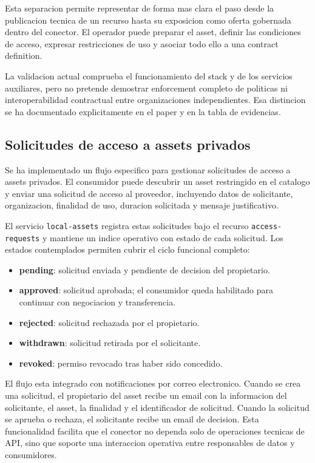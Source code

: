\documentclass{article}
\begin{document}
Esta separacion permite representar de forma mas clara el paso desde la publicacion tecnica de un recurso hasta su exposicion como oferta gobernada dentro del conector. El operador puede preparar el asset, definir las condiciones de acceso, expresar restricciones de uso y asociar todo ello a una contract definition.

La validacion actual comprueba el funcionamiento del stack y de los servicios auxiliares, pero no pretende demostrar enforcement completo de politicas ni interoperabilidad contractual entre organizaciones independientes. Esa distincion se ha documentado explicitamente en el paper y en la tabla de evidencias.

\subsection{Solicitudes de acceso a assets privados}

Se ha implementado un flujo especifico para gestionar solicitudes de acceso a assets privados. El consumidor puede descubrir un asset restringido en el catalogo y enviar una solicitud de acceso al proveedor, incluyendo datos de solicitante, organizacion, finalidad de uso, duracion solicitada y mensaje justificativo.

El servicio \texttt{local-assets} registra estas solicitudes bajo el recurso \texttt{access-requests} y mantiene un indice operativo con estado de cada solicitud. Los estados contemplados permiten cubrir el ciclo funcional completo:

\begin{itemize}[leftmargin=1.2cm]
    \item \textbf{pending}: solicitud enviada y pendiente de decision del propietario.
    \item \textbf{approved}: solicitud aprobada; el consumidor queda habilitado para continuar con negociacion y transferencia.
    \item \textbf{rejected}: solicitud rechazada por el propietario.
    \item \textbf{withdrawn}: solicitud retirada por el solicitante.
    \item \textbf{revoked}: permiso revocado tras haber sido concedido.
\end{itemize}

El flujo esta integrado con notificaciones por correo electronico. Cuando se crea una solicitud, el propietario del asset recibe un email con la informacion del solicitante, el asset, la finalidad y el identificador de solicitud. Cuando la solicitud se aprueba o rechaza, el solicitante recibe un email de decision. Esta funcionalidad facilita que el conector no dependa solo de operaciones tecnicas de API, sino que soporte una interaccion operativa entre responsables de datos y consumidores.
\end{document}

